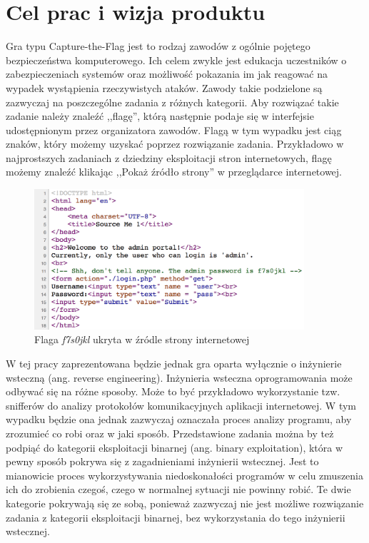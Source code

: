 \documentclass[language=polish,type=eng]{aghmodern}
\author{Piotr Szczygieł}
\date{2020}
\begin{document}
\frontmatter
\maketitle
\tableofcontents

\mainmatter

\chapter{Cel prac i wizja produktu}

Gra typu Capture-the-Flag jest to rodzaj zawodów z ogólnie pojętego
bezpieczeństwa komputerowego. Ich celem zwykle jest edukacja uczestników
o zabezpieczeniach systemów oraz możliwość pokazania im jak reagować
na wypadek wystąpienia rzeczywistych ataków. Zawody takie podzielone są zazwyczaj
na poszczególne zadania z różnych kategorii. Aby rozwiązać takie zadanie należy
znaleźć ,,flagę'', którą następnie podaje się w interfejsie udostępnionym przez
organizatora zawodów. Flagą w tym wypadku jest ciąg znaków, który możemy uzyskać
poprzez rozwiązanie zadania. Przykładowo w najprostszych zadaniach
z dziedziny eksploitacji stron internetowych, flagę możemy znaleźć klikając
,,Pokaż źródło strony'' w przeglądarce internetowej.

\begin{figure}[H]
\centering
\includegraphics[width=10cm]{flag_page_source}
\caption{Flaga \emph{f7s0jkl} ukryta w źródle strony internetowej}
\end{figure}

W tej pracy zaprezentowana będzie jednak gra oparta
wyłącznie o inżynierie wsteczną (ang. reverse engineering).
Inżynieria wsteczna oprogramowania może odbywać się na różne sposoby.
Może to być przykładowo wykorzystanie tzw. snifferów do analizy protokołów
komunikacyjnych aplikacji internetowej. W tym wypadku będzie ona jednak
zazwyczaj oznaczała proces analizy programu, aby zrozumieć co robi
oraz w jaki sposób. Przedstawione zadania można by też podpiąć do kategorii
eksploitacji binarnej (ang. binary exploitation), która w pewny sposób pokrywa
się z zagadnieniami inżynierii wstecznej. Jest to mianowicie proces
wykorzystywania niedoskonałości programów w celu zmuszenia ich do zrobienia
czegoś, czego w normalnej sytuacji nie powinny robić. Te dwie kategorie pokrywają
się ze sobą, ponieważ zazwyczaj nie jest możliwe rozwiązanie zadania z kategorii
eksploitacji binarnej, bez wykorzystania do tego inżynierii wstecznej.
\end{document}
